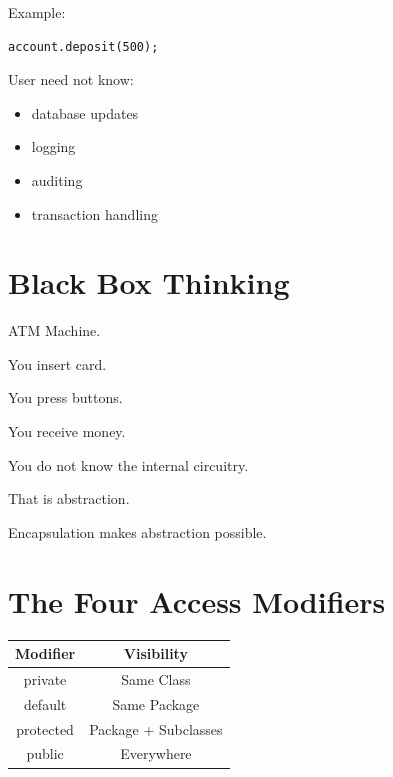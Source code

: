 \documentclass[11pt,a4paper]{book}
\begin{document}
Example:

\begin{verbatim}
account.deposit(500);
\end{verbatim}

User need not know:

\begin{itemize}
\item database updates
\item logging
\item auditing
\item transaction handling
\end{itemize}


\section{Black Box Thinking}

\begin{mentalmodel}

ATM Machine.

You insert card.

You press buttons.

You receive money.

You do not know the internal circuitry.

\end{mentalmodel}

That is abstraction.

Encapsulation makes abstraction possible.


\section{The Four Access Modifiers}

\begin{center}

\begin{tabular}{|c|c|}
\hline
Modifier & Visibility\\
\hline
private & Same Class\\
\hline
default & Same Package\\
\hline
protected & Package + Subclasses\\
\hline
public & Everywhere\\
\hline
\end{tabular}

\end{center}
\end{document}
